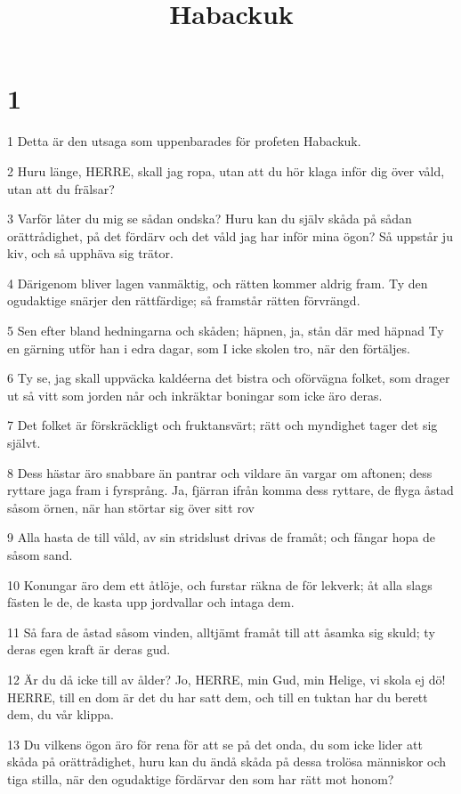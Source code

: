 

\title{Habackuk}


\chapter{1}

\par 1 Detta är den utsaga som uppenbarades för profeten Habackuk.
\par 2 Huru länge, HERRE, skall jag ropa, utan att du hör klaga inför dig över våld, utan att du frälsar?
\par 3 Varför låter du mig se sådan ondska? Huru kan du själv skåda på sådan orättrådighet, på det fördärv och det våld jag har inför mina ögon? Så uppstår ju kiv, och så upphäva sig trätor.
\par 4 Därigenom bliver lagen vanmäktig, och rätten kommer aldrig fram. Ty den ogudaktige snärjer den rättfärdige; så framstår rätten förvrängd.
\par 5 Sen efter bland hedningarna och skåden; häpnen, ja, stån där med häpnad Ty en gärning utför han i edra dagar, som I icke skolen tro, när den förtäljes.
\par 6 Ty se, jag skall uppväcka kaldéerna det bistra och oförvägna folket, som drager ut så vitt som jorden når och inkräktar boningar som icke äro deras.
\par 7 Det folket är förskräckligt och fruktansvärt; rätt och myndighet tager det sig självt.
\par 8 Dess hästar äro snabbare än pantrar och vildare än vargar om aftonen; dess ryttare jaga fram i fyrsprång. Ja, fjärran ifrån komma dess ryttare, de flyga åstad såsom örnen, när han störtar sig över sitt rov
\par 9 Alla hasta de till våld, av sin stridslust drivas de framåt; och fångar hopa de såsom sand.
\par 10 Konungar äro dem ett åtlöje, och furstar räkna de för lekverk; åt alla slags fästen le de, de kasta upp jordvallar och intaga dem.
\par 11 Så fara de åstad såsom vinden, alltjämt framåt till att åsamka sig skuld; ty deras egen kraft är deras gud.
\par 12 Är du då icke till av ålder? Jo, HERRE, min Gud, min Helige, vi skola ej dö! HERRE, till en dom är det du har satt dem, och till en tuktan har du berett dem, du vår klippa.
\par 13 Du vilkens ögon äro för rena för att se på det onda, du som icke lider att skåda på orättrådighet, huru kan du ändå skåda på dessa trolösa människor och tiga stilla, när den ogudaktige fördärvar den som har rätt mot honom?
